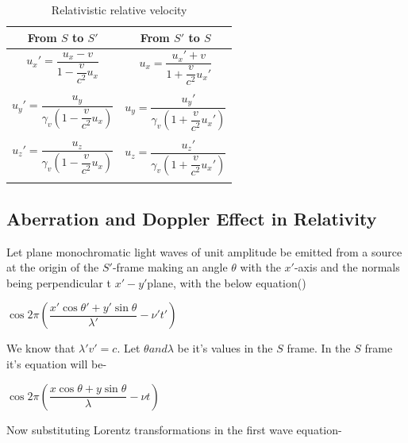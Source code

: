 \documentclass[12pt,a4paper]{article}
\numberwithin{table}{section}
\numberwithin{figure}{section}
\numberwithin{equation}{section}
\theoremstyle{remark}
\theoremstyle{definition}
\begin{document}
\begin{table}[H]
\begin{center}
\begin{tabular}{||c|c||}
\hline
From $S$ to $S'$ & From $S'$ to $S$\\
\hline
$u_x'=\dfrac{u_x-v}{1-\dfrac{v}{c^2}u_x}$ &
$u_x=\dfrac{u_x'+v}{1+\dfrac{v}{c^2}u_x'}$\\ & \\

$u_y'= \dfrac{u_y}{\gamma_v(1-\dfrac{v}{c^2}u_x)}$ &
$u_y= \dfrac{u_y'}{\gamma_v(1+\dfrac{v}{c^2}u_x')}$\\ & \\

$u_z'= \dfrac{u_z}{\gamma_v(1-\dfrac{v}{c^2}u_x)}$ &
$u_z= \dfrac{u_z'}{\gamma_v(1+\dfrac{v}{c^2}u_x')}$\\ & \\
\hline
\end{tabular}
\caption{Relativistic relative velocity}
 \label{table:4}
\end{center}
\end{table}





\subsection{Aberration and Doppler Effect in Relativity}
Let plane monochromatic light waves of unit amplitude  be emitted from a source at the origin of the $S'$-frame making an angle $\theta$ with the $x'$-axis and the normals being perpendicular t $x'-y'$plane, with the below equation()
\begin{center}
$\cos{2\pi(\dfrac{x'\cos{\theta'}+y'\sin{\theta}}{\lambda'}-\nu't')} $
\end{center}
We know that $\lambda'v'=c$. Let $\theta and \lambda$  be it's values in the $S$ frame. In the $S$ frame it's equation will be-

\begin{center}
$\cos{2\pi(\dfrac{x\cos{\theta}+y\sin{\theta}}{\lambda}-\nu t)} $
\end{center}
Now substituting Lorentz transformations in the first wave equation-
\end{document}
